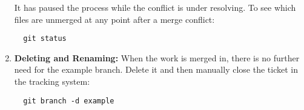 \documentclass[draftclsnofoot,journal,onecolumn,12pt]{IEEEtran}
\begin{document}
\begin{enumerate}
\begin{enumerate}
\begin{verbatim}
\end{verbatim}
  \end{enumerate}
It has paused the process while the conflict is under resolving. To see which files are unmerged at any point after a merge conflict:
\begin{verbatim}
  git status
\end{verbatim}
\item \textbf{Deleting and Renaming:} When the work is merged in, there is no further need for the example branch. Delete it and then manually close the ticket in the tracking system:
\begin{verbatim}
  git branch -d example
\end{verbatim}
\end{enumerate}

%
%
%
%
\end{document}
